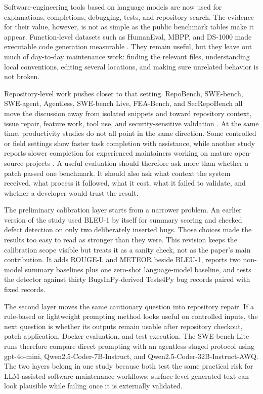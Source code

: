 \documentclass[preprint,12pt]{elsarticle}
\begin{document}
Software-engineering tools based on language models are now used for explanations, completions, debugging, tests, and repository search. The evidence for their value, however, is not as simple as the public benchmark tables make it appear. Function-level datasets such as HumanEval, MBPP, and DS-1000 made executable code generation measurable \cite{chen2021codex,austin2021mbpp,lai2022ds1000}. They remain useful, but they leave out much of day-to-day maintenance work: finding the relevant files, understanding local conventions, editing several locations, and making sure unrelated behavior is not broken.

Repository-level work pushes closer to that setting. RepoBench, SWE-bench, SWE-agent, Agentless, SWE-bench Live, FEA-Bench, and SecRepoBench all move the discussion away from isolated snippets and toward repository context, issue repair, feature work, tool use, and security-sensitive validation \cite{liu2023repobench,jimenez2023swebench,yang2024sweagent,xia2024agentless,zhang2025swebenchlive,li2025feabench,shen2025secrepobench}. At the same time, productivity studies do not all point in the same direction. Some controlled or field settings show faster task completion with assistance, while another study reports slower completion for experienced maintainers working on mature open-source projects \cite{peng2023copilot,paradis2024speed,cui2026effects,becker2025maintainers}. A useful evaluation should therefore ask more than whether a patch passed one benchmark. It should also ask what context the system received, what process it followed, what it cost, what it failed to validate, and whether a developer would trust the result.

The preliminary calibration layer starts from a narrower problem. An earlier version of the study used BLEU-1 by itself for summary scoring and checked defect detection on only two deliberately inserted bugs. Those choices made the results too easy to read as stronger than they were. This revision keeps the calibration scope visible but treats it as a sanity check, not as the paper's main contribution. It adds ROUGE-L and METEOR beside BLEU-1, reports two non-model summary baselines plus one zero-shot language-model baseline, and tests the detector against thirty BugsInPy-derived Tests4Py bug records paired with fixed records.

The second layer moves the same cautionary question into repository repair. If a rule-based or lightweight prompting method looks useful on controlled inputs, the next question is whether its outputs remain usable after repository checkout, patch application, Docker evaluation, and test execution. The SWE-bench Lite runs therefore compare direct prompting with an agentless staged protocol using gpt-4o-mini, Qwen2.5-Coder-7B-Instruct, and Qwen2.5-Coder-32B-Instruct-AWQ. The two layers belong in one study because both test the same practical risk for LLM-assisted software-maintenance workflows: surface-level generated text can look plausible while failing once it is externally validated.
\end{document}
